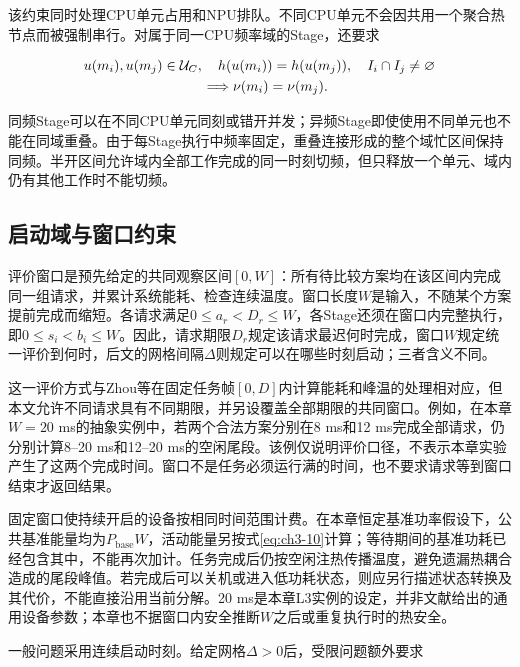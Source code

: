 该约束同时处理CPU单元占用和NPU排队。不同CPU单元不会因共用一个聚合热节点而被强制串行。对属于同一CPU频率域的Stage，还要求

\begin{equation}
\begin{aligned}
&u(m_i),u(m_j)\in\mathcal U_C,\quad h(u(m_i))=h(u(m_j)),\quad I_i\cap I_j\ne\varnothing\\
&\hspace{30mm}\Longrightarrow\nu(m_i)=\nu(m_j).
\end{aligned}
\label{eq:ch3-7}
\end{equation}

同频Stage可以在不同CPU单元同刻或错开并发；异频Stage即使使用不同单元也不能在同域重叠。由于每Stage执行中频率固定，重叠连接形成的整个域忙区间保持同频。半开区间允许域内全部工作完成的同一时刻切频，但只释放一个单元、域内仍有其他工作时不能切频。

\subsection{启动域与窗口约束}

评价窗口是预先给定的共同观察区间\([0,W]\)：所有待比较方案均在该区间内完成同一组请求，并累计系统能耗、检查连续温度。窗口长度\(W\)是输入，不随某个方案提前完成而缩短。各请求满足\(0\le a_r<D_r\le W\)，各Stage还须在窗口内完整执行，即\(0\le s_i<b_i\le W\)。因此，请求期限\(D_r\)规定该请求最迟何时完成，窗口\(W\)规定统一评价到何时，后文的网格间隔\(\Delta\)则规定可以在哪些时刻启动；三者含义不同。

这一评价方式与Zhou等在固定任务帧\([0,D]\)内计算能耗和峰温的处理相对应\cite{source1}，但本文允许不同请求具有不同期限，并另设覆盖全部期限的共同窗口。例如，在本章\(W=20\) ms的抽象实例中，若两个合法方案分别在8 ms和12 ms完成全部请求，仍分别计算8--20 ms和12--20 ms的空闲尾段。该例仅说明评价口径，不表示本章实验产生了这两个完成时间。窗口不是任务必须运行满的时间，也不要求请求等到窗口结束才返回结果。

固定窗口使持续开启的设备按相同时间范围计费。在本章恒定基准功率假设下，公共基准能量均为\(P_{\mathrm{base}}W\)，活动能量另按式\eqref{eq:ch3-10}计算；等待期间的基准功耗已经包含其中，不能再次加计。任务完成后仍按空闲注热传播温度，避免遗漏热耦合造成的尾段峰值。若完成后可以关机或进入低功耗状态，则应另行描述状态转换及其代价，不能直接沿用当前分解。20 ms是本章L3实例的设定，并非文献给出的通用设备参数；本章也不据窗口内安全推断\(W\)之后或重复执行时的热安全。

一般问题采用连续启动时刻。给定网格\(\Delta>0\)后，受限问题额外要求

